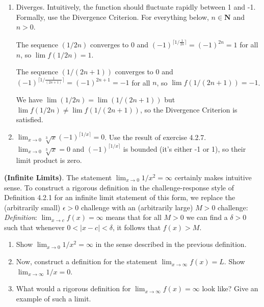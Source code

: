\documentclass{oxmathproblems}
\begin{document}
\begin{questions}
\begin{solution}
\begin{enumerate}[label=(\alph*)]
    \item Diverges. Intuitively, the function should fluctuate rapidly between 1 and -1. Formally, use the Divergence Criterion.
    For everything below, $n \in \textbf{N}$ and $n > 0$. 
    
    The sequence $(1/2n)$ converges to 0 and $(-1)^{\lceil 1/\frac{1}{2n} \rceil} = (-1)^{2n} = 1$ for all $n$, so
    $\lim f(1/2n) = 1$.

    The sequence $(1/(2n+1))$ converges to 0 and $(-1)^{\lceil 1/\frac{1}{(2n+1)} \rceil} = (-1)^{2n+1} = -1$ for all $n$, so
    $\lim f(1/(2n+1)) = -1$.

    We have $\lim (1/2n) = \lim (1/(2n+1))$ but $\lim f(1/2n) \neq \lim f(1/(2n+1))$, so the Divergence Criterion is satisfied.

    \item $\lim_{x \to 0}\sqrt[3]{x}(-1)^{\lceil 1/x \rceil} = 0$. Use the result of exercise 4.2.7. $\lim_{x \to 0}\sqrt[3]{x}=0$ and
    $(-1)^{\lceil 1/x \rceil}$ is bounded (it's either -1 or 1), so their limit product is zero.
  \end{enumerate}
\end{solution}

\miquestion \textbf{(Infinite Limits)}. The statement $\lim_{x \to 0} 1/x^{2} = \infty$ certainly makes intuitive sense. To construct a rigorous definition in the
challenge-response style of Definition 4.2.1 for an infinite limit statement of this form, we replace the (arbitrarily small) $\epsilon > 0$ challenge with an
(arbitrarily large) $M > 0$ challenge:\\
\hspace*{1em} \textit{Definition}: $\lim_{x \to c}f(x)=\infty$ means that for all $M > 0$ we can find a $\delta > 0$ such that whenever $0 < |x-c| < \delta$, it
follows that $f(x) > M$.

\begin{enumerate}[label=(\alph*)]
  \item Show $\lim_{x \to 0}1/x^{2}=\infty$ in the sense described in the previous definition.
  \item Now, construct a definition for the statement $\lim_{x \to \infty}f(x) = L$. Show\\ $\lim_{x \to \infty}1/x=0$.
  \item What would a rigorous definition for $\lim_{x \to \infty}f(x)=\infty$ look like? Give an example of such a limit.
\end{enumerate}


\end{questions}
\end{document}

